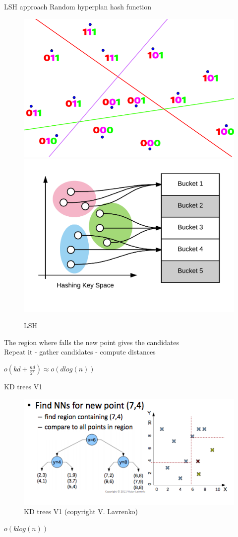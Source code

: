 \documentclass[11 pt]{beamer}
\begin{document}
\begin{frame}{LSH approach}
Random hyperplan \textrightarrow hash function
\begin{figure}
	\centering
	\includegraphics[width=.45\textwidth]{figures/lsh.png}
	\includegraphics[width=.45\textwidth]{figures/lsh2.png}
	\caption{LSH}
	\label{fig:lsh2}
\end{figure}

The region where falls the new point gives the candidates
\\
Repeat it - gather candidates - compute distances

$o(kd + \frac{nd}{2^k})\approx o(dlog(n))$


\end{frame}
%
\begin{frame}{KD trees V1}
\begin{figure}
	\centering
	\includegraphics[width=\textwidth]{figures/lavrenko.png}
	\caption{KD trees V1 (copyright V. Lavrenko)}
	\label{fig:lsh}
\end{figure}
$o(klog(n))$
\end{frame}
%
\end{document}
